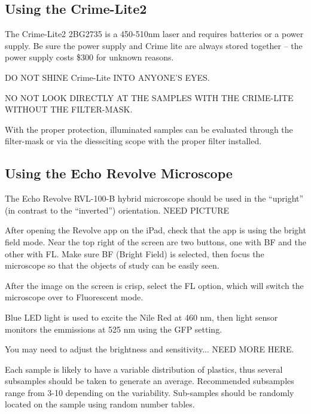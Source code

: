 \documentclass[12pt]{../SOP4_alpha}\usepackage[]{graphicx}\usepackage[]{color}
\begin{document}



\subsection{Using the Crime-Lite2}

\NP The Crime-Lite2 2BG2735 is a 450-510nm laser and requires batteries or a power supply. Be sure the power supply and Crime lite are always stored together -- the power supply costs \$300 for unknown reasons.

\NP DO NOT SHINE Crime-Lite INTO ANYONE'S EYES.

\NP NO NOT LOOK DIRECTLY AT THE SAMPLES WITH THE CRIME-LITE WITHOUT THE FILTER-MASK.

\NP With the proper protection, illuminated samples can be evaluated through the filter-mask or via the diessciting scope with the proper filter installed. 
  
\subsection{Using the Echo Revolve Microscope}

\NP The Echo Revolve RVL-100-B hybrid microscope should be used in the ``upright'' (in contrast to the ``inverted'') orientation. NEED PICTURE

\NP After opening the Revolve app on the iPad, check that the app is using the bright field mode. Near the top right of the screen are two buttons, one with BF and the other with FL. Make sure BF (Bright Field) is selected, then focus the microscope so that the objects of study can be easily seen. 

\NP After the image on the screen is crisp, select the FL option, which will switch the microscope over to Fluorescent mode. 

\NP Blue LED light is used to excite the Nile Red at 460 nm, then light sensor monitors the emmissions at 525 nm using the GFP setting.

\NP You may need to adjust the brightness and sensitivity... NEED MORE HERE.

\NP Each sample is likely to have a variable distribution of plastics, thus several subsamples should be taken to generate an average. Recommended subsamples range from 3-10 depending on the variability. Sub-samples should be randomly located on the sample using random number tables. 
\end{document}
